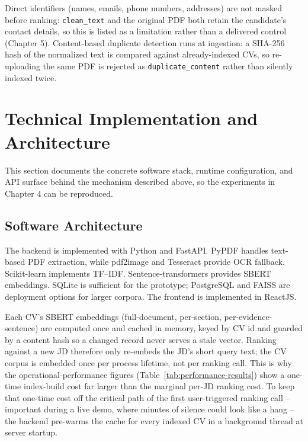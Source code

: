 \documentclass[12pt,a4paper,oneside]{report}
\begin{document}
Direct identifiers (names, emails, phone numbers, addresses) are not masked before ranking: \texttt{clean\_text} and the original PDF both retain the candidate's contact details, so this is listed as a limitation rather than a delivered control (Chapter 5). Content-based duplicate detection runs at ingestion: a SHA-256 hash of the normalized text is compared against already-indexed CVs, so re-uploading the same PDF is rejected as \texttt{duplicate\_content} rather than silently indexed twice.

\section{Technical Implementation and Architecture}
This section documents the concrete software stack, runtime configuration, and API surface behind the mechanism described above, so the experiments in Chapter 4 can be reproduced.

\subsection{Software Architecture}
\label{sec:architecture-impl}
The backend is implemented with Python and FastAPI. PyPDF handles text-based PDF extraction, while pdf2image and Tesseract provide OCR fallback. Scikit-learn implements TF--IDF. Sentence-transformers provides SBERT embeddings. SQLite is sufficient for the prototype; PostgreSQL and FAISS are deployment options for larger corpora. The frontend is implemented in ReactJS.

Each CV's SBERT embeddings (full-document, per-section, per-evidence-sentence) are computed once and cached in memory, keyed by CV id and guarded by a content hash so a changed record never serves a stale vector. Ranking against a new JD therefore only re-embeds the JD's short query text; the CV corpus is embedded once per process lifetime, not per ranking call. This is why the operational-performance figures (Table~\ref{tab:performance-results}) show a one-time index-build cost far larger than the marginal per-JD ranking cost. To keep that one-time cost off the critical path of the first user-triggered ranking call -- important during a live demo, where minutes of silence could look like a hang -- the backend pre-warms the cache for every indexed CV in a background thread at server startup.
\end{document}
